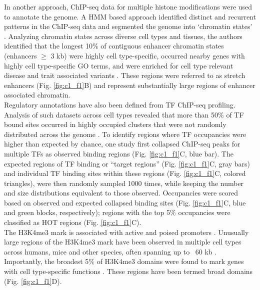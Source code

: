 In another approach, ChIP-seq data for multiple histone modifications were used to annotate the genome. A \ac{HMM} based approach identified distinct and recurrent patterns in the ChIP-seq data and segmented the genome into ‘chromatin states’ \cite{ernstMappingAnalysisChromatin2011, ernstChromHMMAutomatingChromatin2012}. Analyzing chromatin states across diverse cell types and tissues, the authors identified that the longest 10\% of contiguous enhancer chromatin states (enhancers $\geq$ 3 kb) were highly cell type-specific, occurred nearby genes with highly cell type-specific \ac{GO} terms, and were enriched for cell type relevant disease and trait associated variants \cite{parkerChromatinStretchEnhancer2013}. These regions were referred to as stretch enhancers \cite{parkerChromatinStretchEnhancer2013} (Fig. \ref{fig:c1_f1}B) and represent substantially large regions of enhancer associated chromatin. \\

Regulatory annotations have also been defined from TF ChIP-seq profiling. Analysis of such datasets across cell types revealed that more than 50\% of TF bound sites occurred in highly occupied clusters that were not randomly distributed across the genome \cite{moormanHotspotsTranscriptionFactor2006, themodencodeconsortiumIdentificationFunctionalElements2010, theencodeprojectconsortiumIntegratedEncyclopediaDNA2012, boyleComparativeAnalysisRegulatory2014}. To identify regions where TF occupancies were higher than expected by chance, one study first collapsed ChIP-seq peaks for multiple TFs as observed binding regions (Fig.  \ref{fig:c1_f1}C, blue bar). The expected regions of TF binding or “target regions” (Fig.  \ref{fig:c1_f1}C, gray bars) and individual TF binding sites within these regions (Fig.  \ref{fig:c1_f1}C, colored triangles), were then randomly sampled 1000 times, while keeping the number and size distributions equivalent to those observed. Occupancies were scored based on observed and expected collapsed binding sites (Fig.  \ref{fig:c1_f1}C, blue and green blocks, respectively); regions with the top 5\% occupancies were classified as \ac{HOT} regions (Fig. \ref{fig:c1_f1}C). \\

The \ac{H3K4me3} mark is associated with active and poised promoters \cite{bernsteinBivalentChromatinStructure2006, mikkelsenGenomewideMapsChromatin2007,adliGenomewideChromatinMaps2010}. Unusually large regions of the H3K4me3 mark have been observed in multiple cell types across humans, mice and other species, often spanning up to ~60 kb \cite{adliGenomewideChromatinMaps2010,benayounH3K4me3BreadthLinked2014,chenBroadH3K4me3Associated2015}. Importantly, the broadest 5\% of H3K4me3 domains were found to mark genes with cell type-specific functions \cite{benayounH3K4me3BreadthLinked2014,thibodeauChromatinInteractionNetworks2017}. These regions have been termed broad domains (Fig. \ref{fig:c1_f1}D). \\

